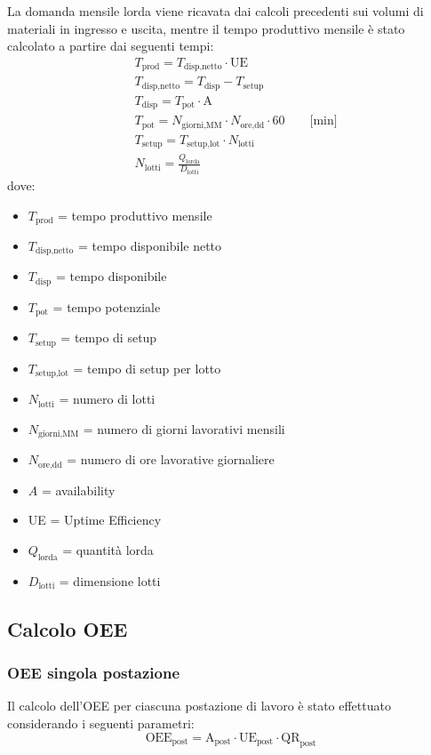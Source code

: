 \documentclass[11pt]{article}
\begin{document}
La domanda mensile lorda viene ricavata dai calcoli precedenti sui volumi di materiali in ingresso e uscita, mentre il tempo produttivo mensile è stato calcolato a partire dai seguenti tempi:
\begin{align}
    & T_\text{prod} = T_\text{disp,netto} \cdot \text{UE} \\
    & T_\text{disp,netto} = T_\text{disp}- T_\text{setup} \\
    & T_\text{disp} = T_\text{pot} \cdot \text{A} \\
    & T_\text{pot} = N_\text{giorni,MM} \cdot N_\text{ore,dd} \cdot 60 \qquad \text{[min]} \\
    & T_\text{setup} = T_\text{setup,lot} \cdot N_\text{lotti} \\
    & N_\text{lotti} = \frac{Q_\text{lorda}}{D_\text{lotti}}
\end{align}
dove:
\begin{itemize}
    \item $T_\text{prod}$ = tempo produttivo mensile
    \item $T_\text{disp,netto}$ = tempo disponibile netto
    \item $T_\text{disp}$ = tempo disponibile
    \item $T_\text{pot}$ = tempo potenziale
    \item $T_\text{setup}$ = tempo di setup
    \item $T_\text{setup,lot}$ = tempo di setup per lotto
    \item $N_\text{lotti}$ = numero di lotti
    \item $N_\text{giorni,MM}$ = numero di giorni lavorativi mensili
    \item $N_\text{ore,dd}$ = numero di ore lavorative giornaliere
    \item $A$ = availability
    \item UE = Uptime Efficiency
    \item $Q_\text{lorda}$ = quantità lorda
    \item $D_\text{lotti}$ = dimensione lotti
\end{itemize}

\subsection{Calcolo OEE}
\subsubsection{OEE singola postazione}
Il calcolo dell'OEE per ciascuna postazione di lavoro è stato effettuato considerando i seguenti parametri:
\begin{equation}
    \text{OEE}_\text{post} = \text{A}_\text{post} \cdot \text{UE}_\text{post} \cdot \text{QR}_\text{post}
\end{equation}
\end{document}
